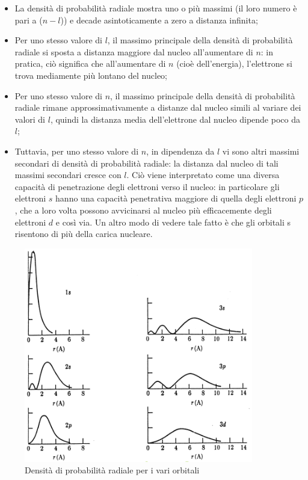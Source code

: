 \begin{itemize}
  \item La densità di probabilità radiale mostra uno o più massimi (il loro numero è pari a ($n-l$)) e decade asintoticamente a zero a distanza infinita;
  \item Per uno stesso valore di $l$, il massimo principale della densità di probabilità radiale si sposta a distanza maggiore dal nucleo all'aumentare di $n$: in pratica, ciò significa che all'aumentare di $n$ (cioè dell'energia), l'elettrone si trova mediamente più lontano del nucleo;
  \item Per uno stesso valore di $n$, il massimo principale della densità di probabilità radiale rimane approssimativamente a distanze dal nucleo simili al variare dei valori di $l$, quindi la distanza media dell'elettrone dal nucleo dipende poco da $l$;
  \item Tuttavia, per uno stesso valore di $n$, in dipendenza da $l$ vi sono altri massimi secondari di densità di probabilità radiale: la distanza dal nucleo di tali massimi secondari cresce con $l$. Ciò viene interpretato come una diversa capacità di penetrazione degli elettroni verso il nucleo: in particolare gli elettroni $s$ hanno una capacità penetrativa maggiore di quella degli elettroni $p$, che a loro volta possono avvicinarsi al nucleo più efficacemente degli elettroni $d$ e così via. Un altro modo di vedere tale fatto è che gli orbitali s risentono di più della carica nucleare.
\end{itemize}

\begin{figure}[htp]
  \centering
  \includegraphics[width=10cm]{immagini/picchi.png}
  \caption*{Densità di probabilità radiale per i vari orbitali}
\end{figure}

